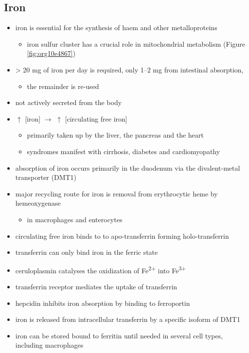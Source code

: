 \documentclass[12pt]{scrartcl}
\begin{document}
\subsection{Iron}
\label{sec:orgc364b1e}
\begin{itemize}
\item iron is essential for the synthesis of haem and other
metalloproteins
\begin{itemize}
\item iron sulfur cluster has a crucial role in mitochondrial metabolism (Figure \ref{fig:org10e4867})
\end{itemize}
\item \textgreater{} 20 mg of iron per day is required, only 1–2 mg from intestinal absorption,
\begin{itemize}
\item the remainder is re-used
\end{itemize}
\item not actively secreted from the body
\item \(\uparrow\) [iron] \(\to\) \(\uparrow\) [circulating free iron]
\begin{itemize}
\item primarily taken up by the liver, the pancreas and the heart
\item syndromes manifest with cirrhosis, diabetes and cardiomyopathy
\end{itemize}
\item absorption of iron occurs primarily in the duodenum via the
divalent-metal transporter (DMT1)
\item major recycling route for iron is removal from erythrocytic heme by
hemeoxygenase
\begin{itemize}
\item in macrophages and enterocytes
\end{itemize}
\item circulating free iron binds to to apo-transferrin forming holo-transferrin
\item transferrin can only bind iron in the ferric state
\item ceruloplasmin catalyses the oxidization of Fe\textsuperscript{2+} into Fe\textsuperscript{3+}
\item transferrin receptor mediates the uptake of transferrin
\item hepcidin inhibits iron absorption by binding to ferroportin
\item iron is released from intracellular transferrin by a specific isoform of DMT1
\item iron can be stored bound to ferritin until needed in several cell
types, including macrophages
\end{itemize}
\end{document}
